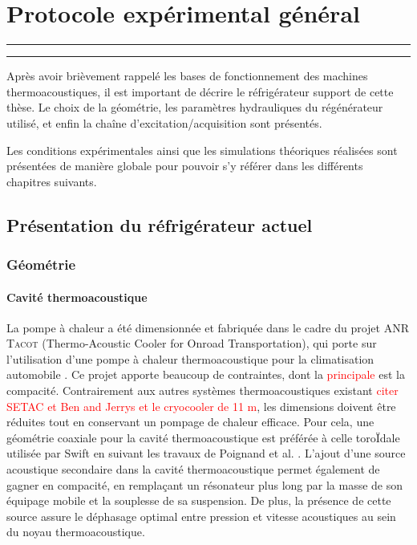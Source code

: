\chapter{Protocole expérimental général}
\vfill
\hrule \vspace{.5cm}
{\hypersetup{linkcolor = black}
\localtableofcontents
}%
\vspace{.5cm} \hrule
\vfill
\clearpage

Après avoir brièvement rappelé les bases de fonctionnement des machines thermoacoustiques, il est important de décrire le réfrigérateur support de cette thèse. Le choix de la géométrie, les paramètres hydrauliques du régénérateur utilisé, et enfin la chaîne d'excitation/acquisition sont présentés.

Les conditions expérimentales ainsi que les simulations théoriques réalisées sont présentées de manière globale pour pouvoir s'y référer dans les différents chapitres suivants.

\section{Présentation du réfrigérateur actuel}
\subsection{Géométrie}

\subsubsection{Cavité thermoacoustique}

La pompe à chaleur a été dimensionnée et fabriquée dans le cadre du projet ANR \textsc{Tacot} (Thermo-Acoustic Cooler for Onroad Transportation), qui porte sur l'utilisation d'une pompe à chaleur thermoacoustique pour la climatisation automobile \cite{ANR_thermo-acoustic_2019}. Ce projet apporte beaucoup de contraintes, dont la \textcolor{red}{principale} est la compacité. Contrairement aux autres systèmes thermoacoustiques existant \textcolor{red}{citer SETAC et Ben and Jerrys et le cryocooler de 11 m}, les dimensions doivent être réduites tout en conservant un pompage de chaleur efficace. Pour cela, une géométrie coaxiale pour la cavité thermoacoustique est préférée à celle toroÏdale utilisée par Swift en suivant les travaux de Poignand et al. \cite{poignand_thermoacoustic_2011,poignand_analysis_2013}. L'ajout d'une source acoustique secondaire dans la cavité thermoacoustique permet également de gagner en compacité, en remplaçant un résonateur plus long par la masse de son équipage mobile et la souplesse de sa suspension. De plus, la présence de cette source assure le déphasage optimal entre pression et vitesse acoustiques au sein du noyau thermoacoustique.%


